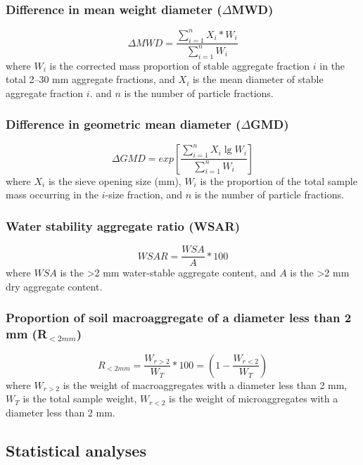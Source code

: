 {\subsubsection{Difference in mean weight diameter ($\Delta$MWD)}

    $$\Delta MWD = \frac{\sum_{i=1}^{n} X_i*W_i}{\sum_{i=1}^{n} W_i}$$
    where $W_i$ is the corrected mass proportion of stable aggregate fraction $i$ in the total 2–30 mm aggregate fractions, and $X_i$ is the mean diameter of stable aggregate fraction $i$. and $n$ is the number of particle fractions.

\subsubsection{Difference in geometric mean diameter ($\Delta$GMD)}
    $$\Delta GMD = exp \left[\frac{\sum_{i=1}^{n} X_i\lg W_i}{\sum_{i=1}^{n} W_i}\right]$$
    where $X_i$ is the sieve opening size (mm), $W_i$ is the proportion of the total sample mass occurring in the $i$-size fraction, and $n$ is the number of particle fractions.

\subsubsection{Water stability aggregate ratio (WSAR)}

    $$WSAR = \frac{WSA}{A}*100$$
    where $WSA$ is the >2 mm water-stable aggregate content, and  $A$ is the >2 mm dry aggregate content.

\subsubsection{Proportion of soil macroaggregate of a diameter less than 2 mm (R$_{<2mm}$)}
    $$R_{<2mm}=\frac{W_{r>2}}{W_T}*100 = \left(1-\frac{W_{r<2}}{W_T}\right)$$
    where $W_{r>2}$ is the weight of macroaggregates with a diameter less than 2 mm, $W_T$ is the total sample weight, $W_{r<2}$ is the weight of microaggregates with a diameter less than 2 mm.
    
\subsection{Statistical analyses}

}
